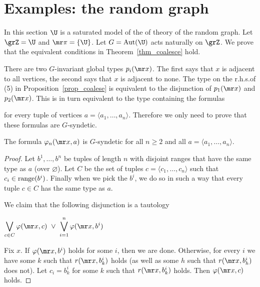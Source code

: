 \section{Examples: the random graph}

In this section $\U$ is a saturated model of the of theory of the random graph.
Let $\grZ=\U$ and ${\mr\pi}=\{\U\}$.
Let $G={\rm Aut}(\U)$ acts naturally on $\grZ$.
We prove that the equivalent conditions in Theorem~\ref{thm_coalesce} hold.

There are two $G$-invariant global types $p_i({\mr x})$.
The first says that $x$ is adjacent to all vertices, the second says that $x$ is adjacent to none.
The type on the r.h.s.\@ of (5) in Proposition~\ref{prop_coalese} is equivalent to the disjunction of $p_1({\mr x})$ and $p_2({\mr x})$.
This is in turn equivalent to the type containing the formulas


for every tuple of vertices $a=\langle a_1,\dots,a_n\rangle$.
Therefore we only need to prove that these formulas are $G$-syndetic.

\begin{theorem}
  The formula $\varphi_n({\mr x},a)$ is $G$-syndetic for all $n\ge 2$ and all $a=\langle a_1,\ldots,a_n\rangle$.
\end{theorem}

\begin{proof}
  Let $b^1,\ldots,b^n$ be tuples of length $n$ with disjoint ranges that have the same type as $a$ (over $\varnothing$). Let $C$ be the set of tuples $c=\langle c_1,\ldots,c_n\rangle$ such that $c_i\in{\rm range}(b^i)$.
  Finally when we pick the $b^i$, we do so in such a way that every tuple $c\in C$ has the same type as $a$.

  We claim that the following disjunction is a tautology

  \hfil$\displaystyle\bigvee_{c\in C}\varphi({\mr x},c)\ \vee\ \bigvee_{i=1}^n \varphi({\mr x},b^i)$

  Fix $x$.
  If $\varphi({\mr x},b^i)$ holds for some $i$, then we are done.
  Otherwise, for every $i$ we have some $k$ such that $r({\mr x},b^i_k)$ holds (as well as some $h$ such that $r({\mr x},b^i_h)$ does not).
  Let $c_i=b^i_k$ for some $k$ such that $r({\mr x},b^i_k)$ holds.
  Then $\varphi({\mr x},c)$ holds.
\end{proof}

